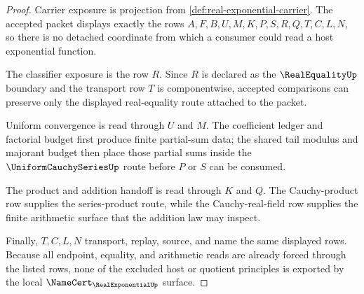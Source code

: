 \begin{proof}
Carrier exposure is projection from \autoref{def:real-exponential-carrier}. The accepted packet displays exactly the rows $A,F,B,U,M,K,P,S,R,Q,T,C,L,N$, so there is no detached coordinate from which a consumer could read a host exponential function.

The classifier exposure is the row $R$. Since $R$ is declared as the $\RealEqualityUp$ boundary and the transport row $T$ is componentwise, accepted comparisons can preserve only the displayed real-equality route attached to the packet.

Uniform convergence is read through $U$ and $M$. The coefficient ledger and factorial budget first produce finite partial-sum data; the shared tail modulus and majorant budget then place those partial sums inside the $\UniformCauchySeriesUp$ route before $P$ or $S$ can be consumed.

The product and addition handoff is read through $K$ and $Q$. The Cauchy-product row supplies the series-product route, while the Cauchy-real-field row supplies the finite arithmetic surface that the addition law may inspect.

Finally, $T,C,L,N$ transport, replay, source, and name the same displayed rows. Because all endpoint, equality, and arithmetic reads are already forced through the listed rows, none of the excluded host or quotient principles is exported by the local $\NameCert_{\RealExponentialUp}$ surface.
\end{proof}

